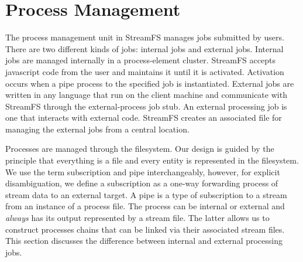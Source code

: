 \section{Process Management}
\label{sec:promngt}

The process management unit in StreamFS manages jobs submitted by users.  There are two different kinds of jobs: internal
jobs and external jobs.  Internal jobs are managed internally in a process-element cluster.  StreamFS accepts javascript code
from the user and maintains it until it is activated.  Activation occurs when a pipe process to the specified job
is instantiated.  External jobs are written in any language that run on the client machine and communicate with StreamFS
through the external-process job stub.  An external processing job
is one that interacts with external code.  StreamFS creates an associated file for managing 
the external jobs from a central location.

Processes are managed through the filesystem.  Our design is guided by the principle that everything is a file and
every entity is represented in the filesystem.  We use the term subscription and pipe interchangeably, however, for 
explicit disambiguation, we define a subscription as a one-way forwarding process of stream data to an external
target.  A pipe is a type of subscription to a stream from an instance of a process file.  The process can
be internal or external and \emph{always} has its output represented by a stream file.  The latter allows us
to construct processes chains that can be linked via their associated stream files.
This section discusses the difference between internal and external processing jobs.  
